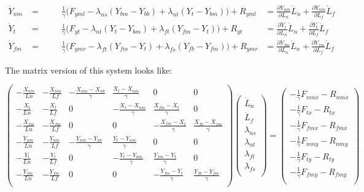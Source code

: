 \documentclass[10pt]{article} %
\begin{document}
\begin{align}
  \dot{Y}_{nm} &= \hspace{1cm} \frac{1}{\gamma} \Big(F_{yml} - \lambda_{ns}(Y_{bm} - Y_{bb})
  + \lambda_{nt}(Y_{t } - Y_{bm}) \Big) + R_{yml}
  &= \frac{\partial Y_{nm}}{\partial L_n}\dot{L}_n + \frac{\partial Y_{nm}}{\partial L_f}\dot{L}_f\\
  \dot{Y}_{t}  &= \hspace{1cm} \frac{1}{\gamma} \Big(F_{yt } - \lambda_{nt}(Y_{t } - Y_{bm})
  + \lambda_{ft}(Y_{fm} - Y_{t }) \Big) + R_{yt }
  &= \frac{\partial Y_{t}}{\partial L_n}\dot{L}_n + \frac{\partial Y_{t}}{\partial L_f}\dot{L}_f\\
  \dot{Y}_{fm} &= \hspace{1cm} \frac{1}{\gamma} \Big(F_{ymr} - \lambda_{ft}(Y_{fm} - Y_{t })
  + \lambda_{fs}(Y_{fb} - Y_{fm}) \Big) + R_{ymr}
  &= \frac{\partial Y_{fm}}{\partial L_n}\dot{L}_n + \frac{\partial Y_{fm}}{\partial L_f}\dot{L}_f
\end{align}

The matrix version of this system looks like:

\[
\begin{pmatrix}
  -\frac{X_{nm}}{Ln} & -\frac{X_{nm}}{Lf}
  & -\frac{X_{nm}-X_{nb}}{\gamma} & \frac{X_{t}-X_{nm}}{\gamma} & 0 & 0\\
  -\frac{X_{t}}{Ln} & -\frac{X_{t}}{Lf}
  & 0 & -\frac{X_{t}-X_{nm}}{\gamma} & \frac{X_{fm}-X_{t}}{\gamma} & 0\\
  -\frac{X_{fm}}{Ln} & -\frac{X_{fm}}{Lf}
  & 0 & 0 & -\frac{X_{fm}-X_{t}}{\gamma} & \frac{X_{fb}-X_{fm}}{\gamma}\\
  -\frac{Y_{nm}}{Ln} & -\frac{Y_{nm}}{Lf}
  & -\frac{Y_{nm}-Y_{nb}}{\gamma} & \frac{Y_{t}-Y_{nm}}{\gamma} & 0 & 0\\
  -\frac{Y_{t}}{Ln} & -\frac{Y_{t}}{Lf}
  & 0 & -\frac{Y_{t}-Y_{nm}}{\gamma} & \frac{Y_{fm}-Y_{t}}{\gamma} & 0\\
  -\frac{Y_{fm}}{Ln} & -\frac{Y_{fm}}{Lf}
  & 0 & 0 & -\frac{Y_{fm}-Y_{t}}{\gamma} & \frac{Y_{fb}-Y_{fm}}{\gamma}\\
\end{pmatrix}
\begin{pmatrix}
  \dot{L}_n\\
  \dot{L}_f\\
  \lambda_{ns}\\
  \lambda_{nt}\\
  \lambda_{ft}\\
  \lambda_{fs}\\
\end{pmatrix}
=
\begin{pmatrix}
  -\frac{1}{\gamma}F_{nmx} - R_{nmx}\\
  -\frac{1}{\gamma}F_{tx}  - R_{tx}\\
  -\frac{1}{\gamma}F_{fmx} - R_{fmx}\\
  -\frac{1}{\gamma}F_{nmy} - R_{nmy}\\
  -\frac{1}{\gamma}F_{ty}  - R_{ty}\\
  -\frac{1}{\gamma}F_{fmy} - R_{fmy}\\
\end{pmatrix}
\]
\end{document}
